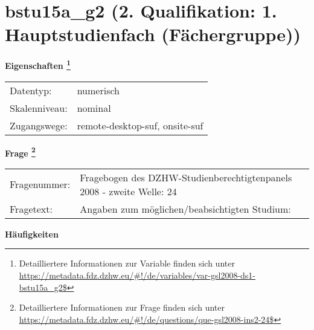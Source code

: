 
    \setcounter{footnote}{0}

    \vspace*{-1.8cm}
	\section{bstu15a\_g2 (2. Qualifikation: 1. Hauptstudienfach (Fächergruppe))}
	\label{section:bstu15a_g2}



    \vspace*{0.5cm}
    \noindent\textbf{Eigenschaften
	\footnote{Detailliertere Informationen zur Variable finden sich unter
		\url{https://metadata.fdz.dzhw.eu/\#!/de/variables/var-gsl2008-ds1-bstu15a_g2$}}}\\
	\begin{tabularx}{\hsize}{@{}lX}
	Datentyp: & numerisch \\
	Skalenniveau: & nominal \\
	Zugangswege: &
	  remote-desktop-suf, 
	  onsite-suf
 \\
    \end{tabularx}



				\vspace*{0.5cm}
                \noindent\textbf{Frage
	                \footnote{Detailliertere Informationen zur Frage finden sich unter
		              \url{https://metadata.fdz.dzhw.eu/\#!/de/questions/que-gsl2008-ins2-24$}}}\\
				\begin{tabularx}{\hsize}{@{}lX}
					Fragenummer: &
					  Fragebogen des DZHW-Studienberechtigtenpanels 2008 - zweite Welle:
					  24
 \\
					Fragetext: & Angaben zum möglichen/beabsichtigten Studium: \\
				\end{tabularx}





        		\vspace*{0.5cm}
                \noindent\textbf{Häufigkeiten}

